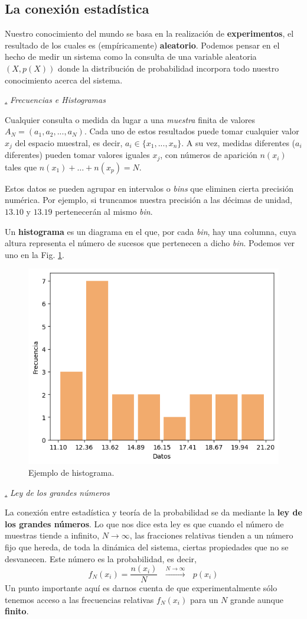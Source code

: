 \documentclass[a4paper,11pt]{book} %
\numberwithin{equation}{chapter}
\def\subsubiContadorIt{\par\addtocounter{subsubsection}{1}\underline{\it\thesubsubsection.}\hskip0.5cm \setcounter{subsubsubsectionIt}{0}}
\newcommand{\SubsubiIt}[1]{
		\subsubiContadorIt \textit{#1}
	}
\newcounter{subsubsubsectionIt}[subsubsection]
\begin{document}
		\subsection{La conexión estadística}

Nuestro conocimiento del mundo se basa en la realización de \textbf{experimentos}, el resultado de los cuales es (empíricamente) \textbf{aleatorio}. Podemos pensar en el hecho de medir un sistema como la consulta de una variable aleatoria $(X,p(X))$ donde la distribución de probabilidad incorpora todo nuestro conocimiento acerca del sistema.

			\SubsubiIt{Frecuencias e Histogramas}

Cualquier consulta o medida da lugar a una \textit{muestra} finita de valores $A_N = (a_1,a_2,...,a_N)$. Cada uno de estos resultados puede tomar cualquier valor $x_j$ del espacio muestral, es decir, $a_i\in \{x_1,...,x_n\}$. A su vez, medidas diferentes ($a_i$ diferentes) pueden tomar valores iguales $x_j$, con números de aparición $n(x_i)$ tales que  $n(x_1) +  \ldots + n(x_p) = N$. 

Estos datos se pueden agrupar en intervalos o \textit{bins} que eliminen cierta precisión numérica. 
Por ejemplo, si truncamos nuestra precisión a las décimas de unidad,  $13.10$ y $13.19$ pertenecerán al mismo \textit{bin}. 

Un \textbf{histograma} es un diagrama en el que, por cada \textit{bin}, hay una columna, cuya altura representa el número de sucesos que pertenecen a dicho \textit{bin}. Podemos ver uno en la Fig. \ref{Fig_formalismo_histograma}. 

	\begin{figure}[t]
	\centering 
	\includegraphics[width=0.4\linewidth]{Figuras/Fig_formalismo_histograma.png}
	\caption{Ejemplo de histograma.}
	\label{Fig_formalismo_histograma}
	\end{figure}

			\SubsubiIt{Ley de los grandes números}

La conexión entre estadística y teoría de la probabilidad se da mediante la \textbf{ley de los grandes números}. Lo que nos dice esta ley es que cuando el número de muestras tiende a infinito, $N\to \infty$, las fracciones relativas tienden a un número fijo que hereda, de toda la dinámica del sistema, ciertas propiedades que no se desvanecen. Este número es la probabilidad, es decir, 
	\begin{equation}
	f_N(x_i) = \frac{n(x_i)}{N}~~~\stackrel{N\to\infty}{\longrightarrow}~~~{p(x_i)}
	\end{equation}
Un punto importante aquí es darnos cuenta de que experimentalmente sólo tenemos acceso a las frecuencias relativas $f_N(x_i)$ para un $N$ grande aunque \textbf{finito}.
\end{document}
